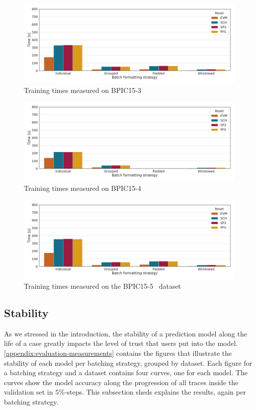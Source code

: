 \begin{figure}
    \centering
    \includegraphics[width=\textwidth]{gfx/bpic2015_3/train_timings.png}
    \caption{Training times measured on BPIC15-3~\cite{BPIC2015}}
    \label{fig:BPIC15-3-training-timings}
\end{figure}
\begin{figure}
    \centering
    \includegraphics[width=\textwidth]{gfx/bpic2015_4/train_timings.png}
    \caption{Training times measured on BPIC15-4~\cite{BPIC2015}}
    \label{fig:BPIC15-4-training-timings}
\end{figure}
\begin{figure}
    \centering
    \includegraphics[width=\textwidth]{gfx/bpic2015_5/train_timings.png}
    \caption{Training times measured on the BPIC15-5~\cite{BPIC2015} dataset}
    \label{fig:BPIC15-5-training-timings}
\end{figure}

\FloatBarrier
\subsection*{Stability}
As we stressed in the introduction, the stability of a prediction model along the life of a case greatly impacts the level of trust that users put into the model. \autoref{appendix:evaluation-measurements} contains the figures that illustrate the stability of each model per batching strategy, grouped by dataset. Each figure for a batching strategy and a dataset contains four curves, one for each model. The curves show the model accuracy along the progression of all traces inside the validation set in $5\%$-steps. This subsection sheds explains the results, again per batching strategy.

